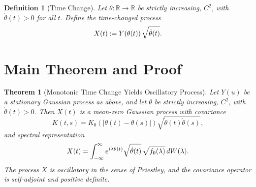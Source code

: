 \documentclass{article}
\newcommand{\assign}{:=}
\newtheorem{definition}{Definition}
\newtheorem{theorem}{Theorem}
\begin{document}
\begin{definition}
  [Time Change] Let $\theta : \mathbb{R} \to \mathbb{R}$ be strictly
  increasing, $C^2$, with $\dot{\theta} (t) > 0$ for all $t$. Define the
  time-changed process
  \[ X (t) \assign Y (\theta (t)) \hspace{0.17em} \sqrt{\dot{\theta} (t)} . \]
\end{definition}

\section{Main Theorem and Proof}

\begin{theorem}
  [Monotonic Time Change Yields Oscillatory Process] Let $Y (u)$ be a
  stationary Gaussian process as above, and let $\theta$ be strictly
  increasing, $C^2$, with $\dot{\theta} (t) > 0$. Then $X (t)$ is a mean-zero
  Gaussian process with covariance
  \[ K (t, s) = K_0 (| \theta (t) - \theta (s) |) \sqrt{\dot{\theta} (t) 
     \dot{\theta} (s)}, \]
  and spectral representation
  \[ X (t) = \int_{- \infty}^{\infty} e^{i \lambda \theta (t)} 
     \sqrt{\dot{\theta} (t)}  \hspace{0.17em} \sqrt{f_0 (\lambda)} 
     \hspace{0.17em} dW (\lambda) . \]
  The process $X$ is oscillatory in the sense of Priestley, and the covariance
  operator is self-adjoint and positive definite.
\end{theorem}
\end{document}
